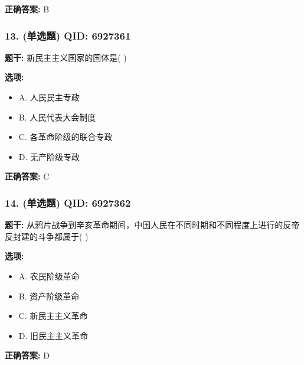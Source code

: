 \documentclass[12pt,UTF8]{ctexart}
\begin{document}
\textbf{正确答案:}
B

\vspace{0.3em}\hrulefill\vspace{0.7em}

\subsubsection*{13. (单选题) \small QID: 6927361}

\textbf{题干:}
新民主主义国家的国体是(   )

\textbf{选项:}
\begin{itemize}[leftmargin=*]

  \item A. 人民民主专政

  \item B. 人民代表大会制度

  \item C. 各革命阶级的联合专政

  \item D. 无产阶级专政

\end{itemize}

\textbf{正确答案:}
C

\vspace{0.3em}\hrulefill\vspace{0.7em}

\subsubsection*{14. (单选题) \small QID: 6927362}

\textbf{题干:}
从鸦片战争到辛亥革命期间，中国人民在不同时期和不同程度上进行的反帝反封建的斗争都属于(  )

\textbf{选项:}
\begin{itemize}[leftmargin=*]

  \item A. 农民阶级革命

  \item B. 资产阶级革命

  \item C. 新民主主义革命

  \item D. 旧民主主义革命

\end{itemize}

\textbf{正确答案:}
D

\vspace{0.3em}\hrulefill\vspace{0.7em}
\end{document}
